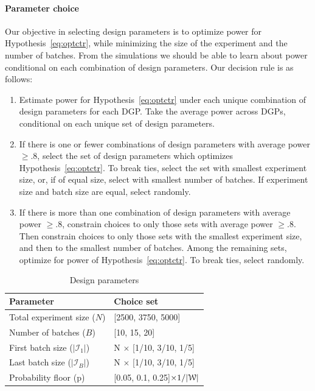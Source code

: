 \documentclass[letterpaper, 12pt, parskip=full,]{scrartcl}
\begin{document}
\paragraph{Parameter choice}
Our objective in selecting design parameters is to optimize power for Hypothesis~\ref{eq:optctr}, while minimizing the size of the experiment and the number of batches. From the simulations we should be able to learn about power conditional on each combination of design parameters. Our decision rule is as follows:
\begin{enumerate}
\item Estimate power for Hypothesis~\ref{eq:optctr} under each unique combination of design parameters for each DGP. Take the average power across DGPs, conditional on each unique set of design parameters. 
\item If there is one or fewer combinations of design parameters with average power $\ge.8$, select the set of design parameters which optimizes Hypothesis~\ref{eq:optctr}. To break ties, select the set with smallest experiment size, or, if of equal size, select with smallest number of batches. If experiment size and batch size are equal, select randomly. 
\item If there is more than one combination of design parameters with average power $\ge.8$, constrain choices to only those sets with average power $\ge.8$. Then constrain choices to only those sets with the smallest experiment size, and then to the smallest number of batches. Among the remaining sets, optimize for power of Hypothesis~\ref{eq:optctr}. To break ties, select randomly. 
\end{enumerate}

\begin{table}[H]
\centering
\caption{Design parameters} 
\label{tab:design}
\begin{tabular}{l | l}
\textbf{Parameter} & \textbf{Choice set} \\ \hline
Total experiment size ($N$)& [2500, 3750, 5000] \\
Number of batches ($B$)& [10, 15, 20] \\
First batch size ($|\mathcal{I}_1|$) & N $\times$ [1/10, 3/10, 1/5] \\
Last batch size ($|\mathcal{I}_B|$) & N $\times$ [1/10, 3/10, 1/5] \\
Probability floor (p)& [0.05, 0.1, 0.25]$\times 1/ |{\EuScript W}|$ \\
\hline
\end{tabular}
\end{table}
\end{document}
